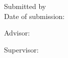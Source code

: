 
\thispagestyle{empty}

\noindent\myTitle{} \\
\noindent\myDegree{} \\
\noindent\myThesiscode{}

\bigskip

\noindent Submitted by \myName{} \\
\noindent Date of submission: \myTime{}

\bigskip

\noindent Advisor: \myProf{}

\noindent Supervisor: \mySupervisor{}


\hfill

\vfill

\noindent \myUni{} \\
\noindent \myFaculty{} \\
\noindent \myDepartment{} \\
